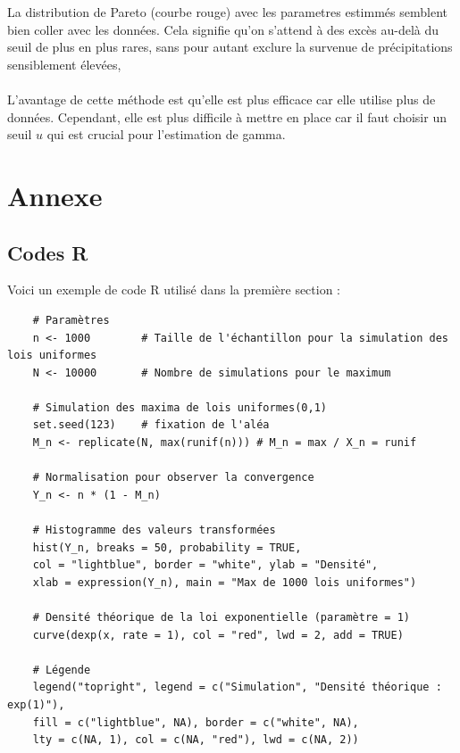 \documentclass{article}
\begin{document}
La distribution de Pareto (courbe rouge) avec les parametres estimmés semblent bien coller avec les données. Cela signifie qu’on s’attend à des excès au-delà du seuil de plus en plus rares, sans pour autant exclure la survenue de précipitations sensiblement élevées,
\\
\\
L'avantage de cette méthode est qu'elle est plus efficace car elle utilise plus de données. Cependant, elle est plus difficile à mettre en place car il faut choisir un seuil $u$ qui est crucial pour l'estimation de gamma.

\newpage
\section{Annexe}

\subsection{Codes R}

\noindent Voici un exemple de code R utilisé dans la première section :

\begin{lstlisting}
	# Paramètres
	n <- 1000        # Taille de l'échantillon pour la simulation des lois uniformes
	N <- 10000       # Nombre de simulations pour le maximum
	
	# Simulation des maxima de lois uniformes(0,1)
	set.seed(123)    # fixation de l'aléa
	M_n <- replicate(N, max(runif(n))) # M_n = max / X_n = runif
	
	# Normalisation pour observer la convergence
	Y_n <- n * (1 - M_n)
	
	# Histogramme des valeurs transformées
	hist(Y_n, breaks = 50, probability = TRUE, 
	col = "lightblue", border = "white", ylab = "Densité",
	xlab = expression(Y_n), main = "Max de 1000 lois uniformes")
	
	# Densité théorique de la loi exponentielle (paramètre = 1)
	curve(dexp(x, rate = 1), col = "red", lwd = 2, add = TRUE)
	
	# Légende
	legend("topright", legend = c("Simulation", "Densité théorique : exp(1)"),
	fill = c("lightblue", NA), border = c("white", NA), 
	lty = c(NA, 1), col = c(NA, "red"), lwd = c(NA, 2))
\end{lstlisting}
\end{document}
